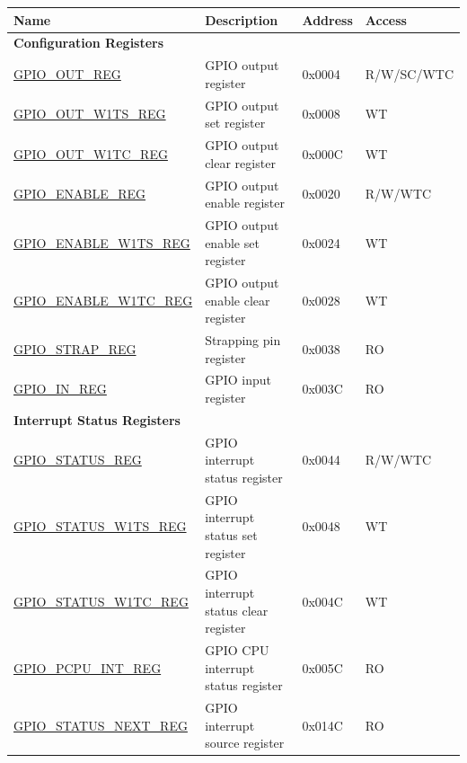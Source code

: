 \begin{longtable}{ | p{5.8cm} | p{7.2cm} | p{1.3cm} | p{2cm} | }
\hline\rowcolor{lightgray}
\textbf{Name} & \textbf{Description} &  \textbf{Address} & \textbf{Access} \\ \hline
\endhead

\multicolumn{4}{|l|}{\textbf{Configuration Registers}} \\ \hline
\hyperref[regdesc:GPIOOUTREG]{GPIO\_OUT\_REG} & GPIO output register & 0x0004 & R/W/SC/WTC \\ \hline
\hyperref[regdesc:GPIOOUTW1TSREG]{GPIO\_OUT\_W1TS\_REG} & GPIO output set register & 0x0008 & WT \\ \hline
\hyperref[regdesc:GPIOOUTW1TCREG]{GPIO\_OUT\_W1TC\_REG} & GPIO output clear register & 0x000C & WT \\ \hline
\hyperref[regdesc:GPIOENABLEREG]{GPIO\_ENABLE\_REG} & GPIO output enable register & 0x0020 & R/W/WTC \\ \hline
\hyperref[regdesc:GPIOENABLEW1TSREG]{GPIO\_ENABLE\_W1TS\_REG} & GPIO output enable set register & 0x0024 & WT \\ \hline
\hyperref[regdesc:GPIOENABLEW1TCREG]{GPIO\_ENABLE\_W1TC\_REG} & GPIO output enable clear register & 0x0028 & WT \\ \hline
\hyperref[regdesc:GPIOSTRAPREG]{GPIO\_STRAP\_REG} & Strapping pin register & 0x0038 & RO \\ \hline
\hyperref[regdesc:GPIOINREG]{GPIO\_IN\_REG} & GPIO input register & 0x003C & RO \\ \hline

\multicolumn{4}{|l|}{\textbf{Interrupt Status Registers}} \\ \hline
\hyperref[regdesc:GPIOSTATUSREG]{GPIO\_STATUS\_REG} & GPIO interrupt status register & 0x0044 & R/W/WTC \\ \hline
\hyperref[regdesc:GPIOSTATUSW1TSREG]{GPIO\_STATUS\_W1TS\_REG} & GPIO interrupt status set register & 0x0048 & WT \\ \hline
\hyperref[regdesc:GPIOSTATUSW1TCREG]{GPIO\_STATUS\_W1TC\_REG} & GPIO interrupt status clear register & 0x004C & WT \\ \hline
\hyperref[regdesc:GPIOPCPUINTREG]{GPIO\_PCPU\_INT\_REG} & GPIO CPU interrupt status register & 0x005C & RO \\ \hline

\hyperref[regdesc:GPIOSTATUSNEXTREG]{GPIO\_STATUS\_NEXT\_REG} & GPIO interrupt source register & 0x014C & RO \\ \hline


\end{longtable}
